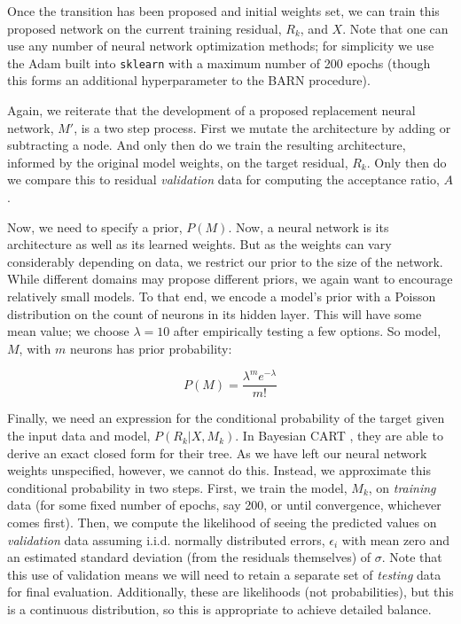 \documentclass[12pt]{article}
\begin{document}
Once the transition has been proposed and initial weights set, we can train this proposed network on the current training residual, $R_k$, and $X$.  Note that one can use any number of neural network optimization methods; for simplicity we use the Adam built into \texttt{sklearn} \cite{kingma2014adam} with a maximum number of 200 epochs (though this forms an additional hyperparameter to the BARN procedure).

Again, we reiterate that the development of a proposed replacement neural network, $M'$, is a two step process.  First we mutate the architecture by adding or subtracting a node.  And only then do we train the resulting architecture, informed by the original model weights, on the target residual, $R_k$.  Only then do we compare this to residual \emph{validation} data for computing the acceptance ratio, $A$.

Now, we need to specify a prior, $P(M)$.  Now, a neural network is its architecture as well as its learned weights.  But as the weights can vary considerably depending on data, we restrict our prior to the size of the network.  While different domains may propose different priors, we again want to encourage relatively small models.  To that end, we encode a model's prior with a Poisson distribution on the count of neurons in its hidden layer.  This will have some mean value; we choose $\lambda=10$ after empirically testing a few options.  So model, $M$, with $m$ neurons has prior probability:

$$
P(M) = \frac{\lambda^m e^{-\lambda}}{m!}
$$

Finally, we need an expression for the conditional probability of the target given the input data and model, $P(R_k|X,M_k)$.  In Bayesian CART \cite{chipman1998bayesian}, they are able to derive an exact closed form for their tree.  As we have left our neural network weights unspecified, however, we cannot do this.  Instead, we approximate this conditional probability in two steps.  First, we train the model, $M_k$, on \emph{training} data (for some fixed number of epochs, say 200, or until convergence, whichever comes first).  Then, we compute the likelihood of seeing the predicted values on \emph{validation} data assuming i.i.d. normally distributed errors, $\epsilon_i$ with mean zero and an estimated standard deviation (from the residuals themselves) of $\sigma$.  Note that this use of validation means we will need to retain a separate set of \emph{testing} data for final evaluation.  Additionally, these are likelihoods (not probabilities), but this is a continuous distribution, so this is appropriate to achieve detailed balance.
\end{document}
